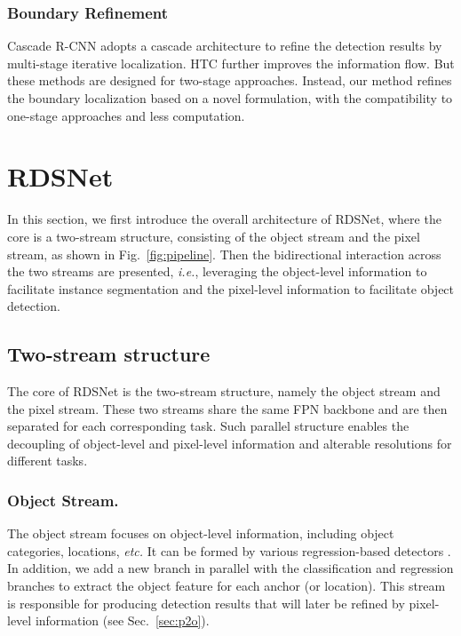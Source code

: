 \documentclass[letterpaper]{article} \usepackage{aaai20}  \usepackage{times}  \usepackage{helvet} \usepackage{courier}  \usepackage[hyphens]{url}  \usepackage{graphicx} \urlstyle{rm} \def\UrlFont{\rm}  \usepackage{graphicx}  \frenchspacing  \setlength{\pdfpagewidth}{8.5in}  \setlength{\pdfpageheight}{11in}
\newcommand{\ie}{\textit{i.e.}}
\begin{document}
\subsubsection{Boundary Refinement}
Cascade R-CNN \cite{cai2018cascade} adopts a cascade architecture to refine the detection results by multi-stage iterative localization. HTC \cite{chen2019hybrid} further improves the information flow. But these methods are designed for two-stage approaches. Instead, our method refines the boundary localization based on a novel formulation, with the compatibility to one-stage approaches and less computation.


\section{RDSNet}
In this section, we first introduce the overall architecture of RDSNet, where the core is a two-stream structure, consisting of the object stream and the pixel stream, as shown in Fig.~\ref{fig:pipeline}. Then the bidirectional interaction across the two streams are presented, \ie, leveraging the object-level information to facilitate instance segmentation and the pixel-level information to facilitate object detection.

\subsection{Two-stream structure}
The core of RDSNet is the two-stream structure, namely the object stream and the pixel stream. These two streams share the same FPN \cite{lin2017feature} backbone and are then separated for each corresponding task. Such parallel structure enables the decoupling of object-level and pixel-level information and alterable resolutions for different tasks. 

\subsubsection{Object Stream.}
The object stream focuses on object-level information, including object categories, locations, \textit{etc.} It can be formed by various regression-based detectors \cite{liu2016ssd,redmon1804yolov3,lin2017focal}. In addition, we add a new branch in parallel with the classification and regression branches to extract the object feature for each anchor (or location). This stream is responsible for producing detection results that will later be refined by pixel-level information (see Sec.~\ref{sec:p2o}).
\end{document}
